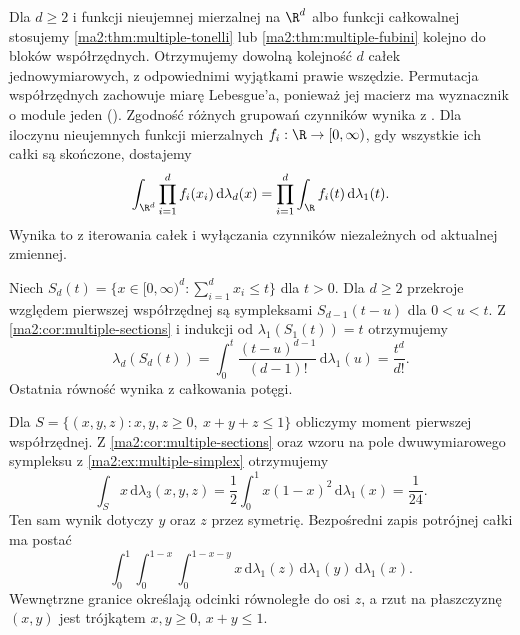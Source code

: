 Dla $d\ge2$ i funkcji nieujemnej mierzalnej na
$\R^d$ albo funkcji całkowalnej stosujemy
\ref{ma2:thm:multiple-tonelli} lub
\ref{ma2:thm:multiple-fubini} kolejno do bloków
współrzędnych. Otrzymujemy dowolną kolejność
$d$ całek jednowymiarowych, z odpowiednimi
wyjątkami prawie wszędzie. Permutacja współrzędnych
zachowuje miarę Lebesgue'a, ponieważ jej macierz
ma wyznacznik o module jeden
().
Zgodność różnych
grupowań czynników wynika z
.
Dla iloczynu nieujemnych funkcji mierzalnych
$f_i:\R\to[0,\infty)$, gdy wszystkie ich
całki są skończone, dostajemy
\[
 \int_{\R^d}\prod_{i=1}^d f_i(x_i)\,
 \mathrm d\lambda_d(x)=
 \prod_{i=1}^d\int_\R f_i(t)\,\mathrm d\lambda_1(t).
\]
Wynika to z iterowania całek i wyłączania
czynników niezależnych od aktualnej zmiennej.

\begin{przyklad}
\label{ma2:ex:multiple-simplex}
Niech $S_d(t)=\{x\in[0,\infty)^d:
\sum_{i=1}^d x_i\le t\}$ dla $t>0$.
Dla $d\ge2$ przekroje względem pierwszej
współrzędnej są sympleksami $S_{d-1}(t-u)$ dla $0<u<t$.
Z \ref{ma2:cor:multiple-sections} i indukcji
od $\lambda_1(S_1(t))=t$ otrzymujemy
\[
 \lambda_d(S_d(t))=\int_0^t
 \frac{(t-u)^{d-1}}{(d-1)!}\,\mathrm d\lambda_1(u)
 =\frac{t^d}{d!}.
\]
Ostatnia równość wynika z całkowania potęgi.
\end{przyklad}

\begin{przyklad}
\label{ma2:ex:multiple-tetrahedron}
Dla $S=\{(x,y,z):x,y,z\ge0,\ x+y+z\le1\}$
obliczymy moment pierwszej współrzędnej.
Z \ref{ma2:cor:multiple-sections} oraz wzoru
na pole dwuwymiarowego sympleksu z
\ref{ma2:ex:multiple-simplex} otrzymujemy
\[
 \int_S x\,\mathrm d\lambda_3(x,y,z)
 =\frac12\int_0^1x(1-x)^2\,\mathrm d\lambda_1(x)
 =\frac1{24}.
\]
Ten sam wynik dotyczy $y$ oraz $z$ przez symetrię.
Bezpośredni zapis potrójnej całki ma postać
\[
 \int_0^1\int_0^{1-x}\int_0^{1-x-y}
 x\,\mathrm d\lambda_1(z)\,\mathrm d\lambda_1(y)\,
 \mathrm d\lambda_1(x).
\]
Wewnętrzne granice określają odcinki równoległe
do osi $z$, a rzut na płaszczyznę $(x,y)$
jest trójkątem $x,y\ge0$, $x+y\le1$.
\end{przyklad}

